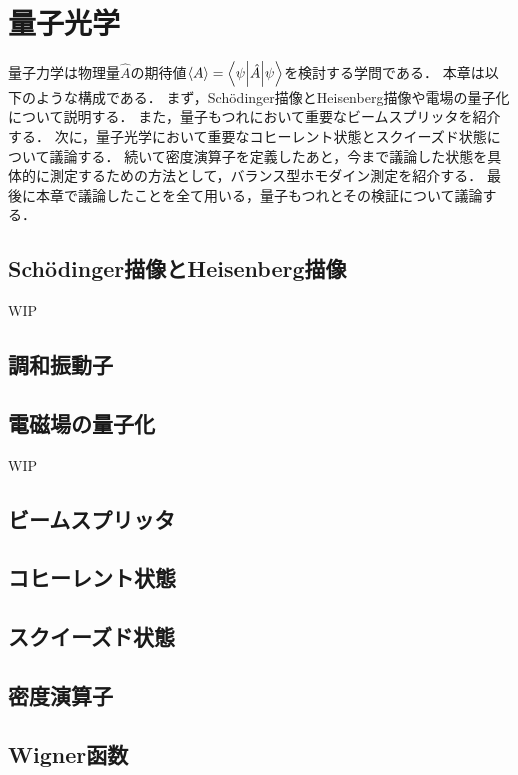 \documentclass{report}
\begin{document}
  \maketitle
  \tableofcontents
  \chapter{量子光学}
    量子力学は物理量$\hat{A}$の期待値$\ev{A} = \mel**{\psi}{\hat{A}}{\psi}$を検討する学問である．
    本章は以下のような構成である．
    まず，Sch\"odinger描像とHeisenberg描像や電場の量子化について説明する．
    また，量子もつれにおいて重要なビームスプリッタを紹介する．
    次に，量子光学において重要なコヒーレント状態とスクイーズド状態について議論する．
    続いて密度演算子を定義したあと，今まで議論した状態を具体的に測定するための方法として，バランス型ホモダイン測定を紹介する．
    最後に本章で議論したことを全て用いる，量子もつれとその検証について議論する．
    \section{Sch\"odinger描像とHeisenberg描像}
      WIP
    \section{調和振動子}
      
    \section{電磁場の量子化}
      WIP
    \section{ビームスプリッタ}
      
    \section{コヒーレント状態}
      
    \section{スクイーズド状態}
      
    \section{密度演算子}
    \section{Wigner函数}
\end{document}
